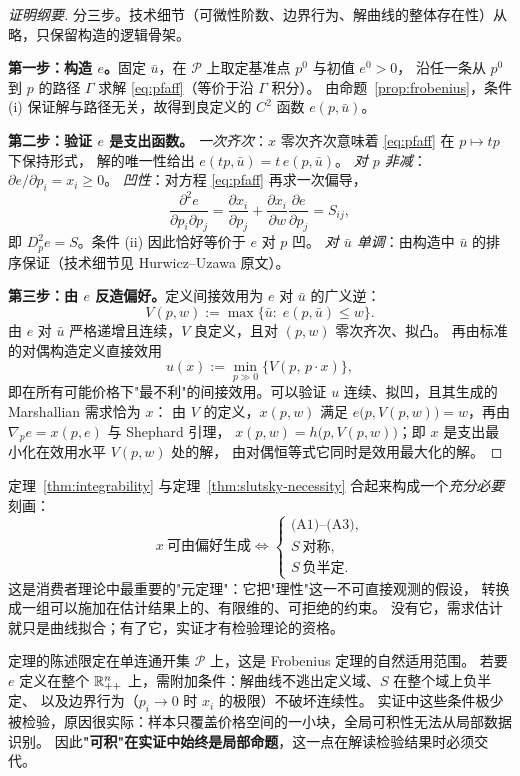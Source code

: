 \begin{proof}[证明纲要]
分三步。技术细节（可微性阶数、边界行为、解曲线的整体存在性）从略，只保留构造的逻辑骨架。

\textbf{第一步：构造 $e$。}固定 $\bar u$，在 $\mathcal P$ 上取定基准点 $p^0$ 与初值 $e^0>0$，
沿任一条从 $p^0$ 到 $p$ 的路径 $\Gamma$ 求解 \eqref{eq:pfaff}（等价于沿 $\Gamma$ 积分）。
由命题~\ref{prop:frobenius}，条件 (i) 保证解与路径无关，故得到良定义的 $C^2$ 函数 $e(p,\bar u)$。

\textbf{第二步：验证 $e$ 是支出函数。}
\emph{一次齐次}：$x$ 零次齐次意味着 \eqref{eq:pfaff} 在 $p\mapsto tp$ 下保持形式，
解的唯一性给出 $e(tp,\bar u)=t\,e(p,\bar u)$。
\emph{对 $p$ 非减}：$\partial e/\partial p_i=x_i\ge0$。
\emph{凹性}：对方程 \eqref{eq:pfaff} 再求一次偏导，
\[
 \frac{\partial^2e}{\partial p_i\partial p_j}
 =\frac{\partial x_i}{\partial p_j}+\frac{\partial x_i}{\partial w}\frac{\partial e}{\partial p_j}
 =S_{ij},
\]
即 $D_p^2e=S$。条件 (ii) 因此恰好等价于 $e$ 对 $p$ 凹。
\emph{对 $\bar u$ 单调}：由构造中 $\bar u$ 的排序保证（技术细节见 Hurwicz--Uzawa 原文）。

\textbf{第三步：由 $e$ 反造偏好。}定义间接效用为 $e$ 对 $\bar u$ 的广义逆：
\[
 V(p,w):=\max\{\bar u:\;e(p,\bar u)\le w\}.
\]
由 $e$ 对 $\bar u$ 严格递增且连续，$V$ 良定义，且对 $(p,w)$ 零次齐次、拟凸。
再由标准的对偶构造定义直接效用
\[
 u(x):=\min_{p\gg0}\bigl\{V(p,\,p\cdot x)\bigr\},
\]
即在所有可能价格下"最不利"的间接效用。可以验证 $u$ 连续、拟凹，且其生成的 Marshallian 需求恰为 $x$：
由 $V$ 的定义，$x(p,w)$ 满足 $e\bigl(p,V(p,w)\bigr)=w$，再由 $\nabla_pe=x(p,e)$ 与 Shephard 引理，
$x(p,w)=h\bigl(p,V(p,w)\bigr)$；即 $x$ 是支出最小化在效用水平 $V(p,w)$ 处的解，
由对偶恒等式它同时是效用最大化的解。
\end{proof}

\begin{remark}[定理的地位]
定理~\ref{thm:integrability} 与定理~\ref{thm:slutsky-necessity} 合起来构成一个\emph{充分必要}刻画：
\[
 x\ \text{可由偏好生成}
 \iff
 \begin{cases}
 \text{(A1)--(A3)},\\
 S\ \text{对称},\\
 S\ \text{负半定}.
 \end{cases}
\]
这是消费者理论中最重要的"元定理"：它把"理性"这一不可直接观测的假设，
转换成一组可以施加在估计结果上的、有限维的、可拒绝的约束。
没有它，需求估计就只是曲线拟合；有了它，实证才有检验理论的资格。
\end{remark}

\begin{remark}[局部与全局的分界]
定理的陈述限定在单连通开集 $\mathcal P$ 上，这是 Frobenius 定理的自然适用范围。
若要 $e$ 定义在整个 $\mathbb{R}^n_{++}$ 上，需附加条件：解曲线不逃出定义域、$S$ 在整个域上负半定、
以及边界行为（$p_i\to0$ 时 $x_i$ 的极限）不破坏连续性。
实证中这些条件极少被检验，原因很实际：样本只覆盖价格空间的一小块，全局可积性无法从局部数据识别。
因此\textbf{"可积"在实证中始终是局部命题}，这一点在解读检验结果时必须交代。
\end{remark}

